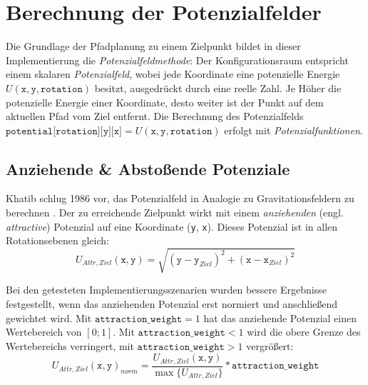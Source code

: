 \chapter{Berechnung der Potenzialfelder}

Die Grundlage der Pfadplanung zu einem Zielpunkt bildet in dieser Implementierung die \textit{Potenzialfeldmethode}:
Der Konfigurationsraum entspricht einem skalaren \textit{Potenzialfeld}, wobei jede Koordinate eine potenzielle Energie $U(\texttt{x}, \texttt{y}, \texttt{rotation})$ besitzt, ausgedrückt durch eine reelle Zahl.
Je Höher die potenzielle Energie einer Koordinate, desto weiter ist der Punkt auf dem aktuellen Pfad vom Ziel entfernt.
Die Berechnung des Potenzialfelds $\texttt{potential[rotation][y][x]} = U(\texttt{x}, \texttt{y}, \texttt{rotation})$ erfolgt mit \textit{Potenzialfunktionen}. \cite{yujiang.2017}

\vspace*{0.2cm}
\section{Anziehende \& Abstoßende Potenziale} \label{sec:attr-repul-pot}

Khatib schlug 1986 vor, das Potenzialfeld in Analogie zu Gravitationsfeldern zu berechnen \cite{khatib.1985}. Der zu erreichende Zielpunkt wirkt mit einem \textit{anziehenden} (engl. \textit{attractive}) Potenzial auf eine Koordinate (\texttt{y}, \texttt{x}). Dieses Potenzial ist in allen Rotationsebenen gleich:
\vspace*{0.25cm}
\begin{equation*}
U_{Attr, Ziel}(\texttt{x}, \texttt{y}) = \sqrt{(\texttt{y} - \texttt{y}_{Ziel})^2 + (\texttt{x} - \texttt{x}_{Ziel})^2}
\end{equation*}

Bei den getesteten Implementierungsszenarien wurden bessere Ergebnisse festgestellt, wenn das anziehenden Potenzial erst normiert und anschließend gewichtet wird. Mit $\texttt{attraction\_weight} = 1$ hat das anziehende Potenzial einen Wertebereich von $[0;1]$. Mit  $\texttt{attraction\_weight} < 1$ wird die obere Grenze des Wertebereichs verringert, mit $\texttt{attraction\_weight} > 1$ vergrößert:
\vspace*{0.3cm}
\begin{equation*}
U_{Attr, Ziel}(\texttt{x}, \texttt{y})_{norm} = \frac{U_{Attr, Ziel}(\texttt{x}, \texttt{y})}{\max \{ U_{Attr, Ziel}\}} * \texttt{attraction\_weight} 
\end{equation*}

